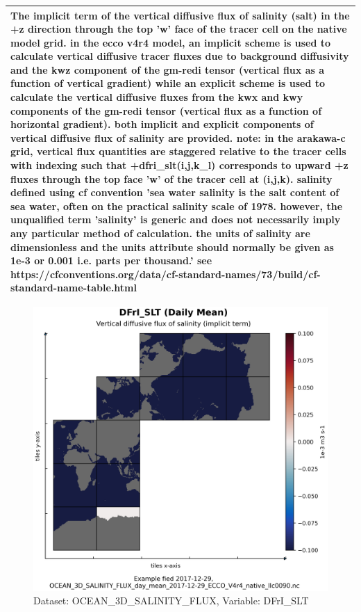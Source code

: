 \begin{longtable}{|m{}|m{}|m{}|m{}|}
\multicolumn{4}{|p{1\textwidth}|}{The implicit term of the vertical diffusive flux of salinity (salt) in the +z direction through the top 'w' face of the tracer cell on the native model grid. in the ecco v4r4 model, an implicit scheme is used to calculate vertical diffusive tracer fluxes due to background diffusivity and the kwz component of the gm-redi tensor (vertical flux as a function of vertical gradient) while an explicit scheme is used to calculate the vertical diffusive fluxes from the kwx and kwy components of the gm-redi tensor (vertical flux as a function of horizontal gradient). both implicit and explicit components of vertical diffusive flux of salinity are provided. note: in the arakawa-c grid, vertical flux quantities are staggered relative to the tracer cells with indexing such that +dfri\_slt(i,j,k\_l) corresponds to upward +z fluxes through the top face 'w' of the tracer cell at (i,j,k). salinity defined using cf convention 'sea water salinity is the salt content of sea water, often on the practical salinity scale of 1978. however, the unqualified term 'salinity' is generic and does not necessarily imply any particular method of calculation. the units of salinity are dimensionless and the units attribute should normally be given as 1e-3 or 0.001 i.e. parts per thousand.' see https://cfconventions.org/data/cf-standard-names/73/build/cf-standard-name-table.html} \\ \hline
\end{longtable}

\begin{figure}[H]
\centering
\includegraphics[scale=0.55]{../images/plots/native_plots/Ocean_Three-Dimensional_Salinity_Fluxes/DFrI_SLT.png}
\caption{Dataset: OCEAN\_3D\_SALINITY\_FLUX, Variable: DFrI\_SLT}
\label{tab:table-OCEAN_3D_SALINITY_FLUX_DFrI_SLT-Plot}
\end{figure}
\pagebreak
